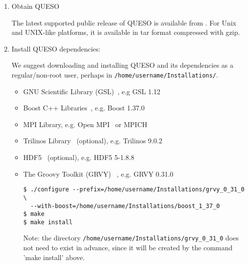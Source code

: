 %
\begin{enumerate}

\item Obtain QUESO

The latest supported public release of QUESO is available from \Quesoweb{}.
For Unix and UNIX-like platforms, it is available in tar format compressed with gzip.  %

\item {Install QUESO dependencies:

We suggest downloading and installing QUESO and its dependencies as a regular/non-root user, perhaps in \texttt{/home/username/Installations/}. %

\begin{itemize}
\item GNU Scientific Library (GSL)~\cite{Gsl}, e.g GSL 1.12
\item Boost C++ Libraries~\cite{Boost}, e.g. Boost 1.37.0
\item MPI Library, e.g. Open MPI~\cite{Openmpi} or MPICH~\cite{Mpich}


\item Trilinos Library~\cite{Trilinos} (optional), e.g. Trilinos 9.0.2
\item HDF5~\cite{HDF5} (optional), e.g. HDF5  5-1.8.8 
\item{ The Groovy Toolkit (GRVY) ~\cite{grvy}, e.g. GRVY 0.31.0
\begin{verbatim}
$ ./configure --prefix=/home/username/Installations/grvy_0_31_0 \
  --with-boost=/home/username/Installations/boost_1_37_0
$ make 
$ make install
\end{verbatim}
Note: the directory \texttt{/home/username/Installations/grvy\_0\_31\_0} does not need to exist in advance, since it will be created by the command 'make install' above.
}
\end{itemize}
}






\end{enumerate}
